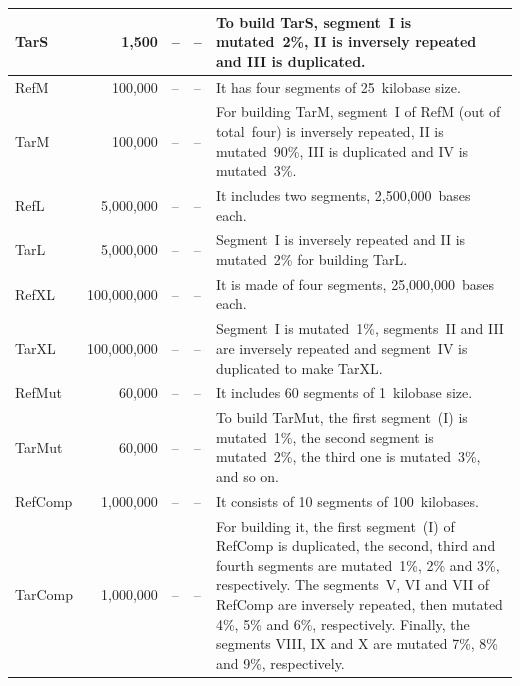 \documentclass[a4paper,num-refs]{oup-contemporary}
\begin{document}
\begin{table}[h]
\begin{tabularx}{\linewidth}{l@{}rllX}
    TarS & 1,500 & -- & -- & To build TarS, segment~I is mutated~2\%, II is inversely repeated and III is duplicated. \\
    \midrule
    RefM & 100,000 & -- & -- & It has four segments of 25~kilobase size. \\
    TarM & 100,000 & -- & -- & For building TarM, segment~I of RefM (out of total~four) is inversely repeated, II is mutated~90\%, III is duplicated and IV is mutated~3\%. \\
    \midrule
    RefL & 5,000,000 & -- & -- & It includes two segments, 2,500,000~bases each. \\
    TarL & 5,000,000 & -- & -- & Segment~I is inversely repeated and II is mutated~2\% for building TarL. \\
    \midrule
    RefXL & 100,000,000 & -- & -- & It is made of four segments, 25,000,000~bases each. \\
    TarXL & 100,000,000 & -- & -- & Segment~I is mutated~1\%, segments~II and III are inversely repeated and segment~IV is duplicated to make TarXL. \\
    \midrule
    RefMut & 60,000 & -- & -- & It includes 60 segments of 1~kilobase size. \\
    TarMut & 60,000 & -- & -- & To build TarMut, the first segment~(I) is mutated~1\%, the second segment is mutated~2\%, the third one is mutated~3\%, and so on. \\
    \midrule
    RefComp & 1,000,000 & -- & -- & It consists of 10 segments of 100~kilobases. \\
    TarComp & 1,000,000 & -- & -- & For building it, the first segment~(I) of RefComp is duplicated, the second, third and fourth segments are mutated~1\%, 2\% and 3\%, respectively. The segments~V, VI and VII of RefComp are inversely repeated, then mutated 4\%, 5\% and 6\%, respectively. Finally, the segments VIII, IX and X are mutated 7\%, 8\% and 9\%, respectively. \\
    \bottomrule
  \end{tabularx}

\end{table}
\end{document}
